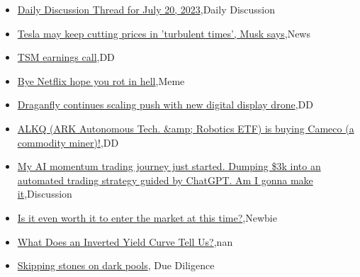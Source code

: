 \documentclass{article}%
\begin{document}
%
\begin{itemize}%
\item%
\href{https://reddit.com/r/wallstreetbets/comments/154mnqb/daily\_discussion\_thread\_for\_july\_20\_2023/}{Daily Discussion Thread for July 20, 2023},Daily Discussion%
\item%
\href{https://reddit.com/r/wallstreetbets/comments/154k6di/tesla\_may\_keep\_cutting\_prices\_in\_turbulent\_times/}{Tesla may keep cutting prices in 'turbulent times', Musk says},News%
\item%
\href{https://reddit.com/r/wallstreetbets/comments/154k68w/tsm\_earnings\_call/}{TSM earnings call},DD%
\item%
\href{https://reddit.com/r/wallstreetbets/comments/154j1ml/bye\_netflix\_hope\_you\_rot\_in\_hell/}{Bye Netflix hope you rot in hell},Meme%
\item%
\href{https://reddit.com/r/Baystreetbets/comments/153yauy/draganfly\_continues\_scaling\_push\_with\_new\_digital/}{Draganfly continues scaling push with new digital display drone},DD%
\item%
\href{https://reddit.com/r/Baystreetbets/comments/153v5iw/alkq\_ark\_autonomous\_tech\_robotics\_etf\_is\_buying/}{ALKQ (ARK Autonomous Tech. \&amp; Robotics ETF) is buying Cameco (a commodity miner)!},DD%
\item%
\href{https://reddit.com/r/StockMarket/comments/1546utu/my\_ai\_momentum\_trading\_journey\_just\_started/}{My AI momentum trading journey just started. Dumping \$3k into an automated trading strategy guided by ChatGPT. Am I gonna make it},Discussion%
\item%
\href{https://reddit.com/r/StockMarket/comments/1543dk6/is\_it\_even\_worth\_it\_to\_enter\_the\_market\_at\_this/}{Is it even worth it to enter the market at this time?},Newbie%
\item%
\href{https://reddit.com/r/Economics/comments/153sgw8/what\_does\_an\_inverted\_yield\_curve\_tell\_us/}{What Does an Inverted Yield Curve Tell Us?},nan%
\item%
\href{https://reddit.com/r/Superstonk/comments/154ffa5/skipping\_stones\_on\_dark\_pools/}{Skipping stones on dark pools}, Due Diligence%
\end{itemize}%
\end{document}

